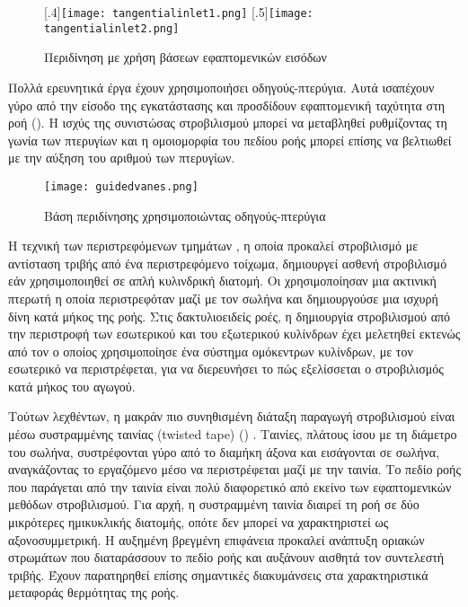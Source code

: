 \begin{figure}[htbp]
\centering
{}	
  [.4\linewidth]{\texttt{[image: tangentialinlet1.png]}}
  [.5\linewidth]{\texttt{[image: tangentialinlet2.png]}}
\caption{Περιδίνηση με χρήση βάσεων εφαπτομενικών εισόδων}\label{fig:tangin}
\end{figure}

Πολλά ερευνητικά έργα \parencites{1976_Murakami}{1975_Zaherzadeh}{1986_Morsi} έχουν χρησιμοποιήσει οδηγούς-πτερύγια. Αυτά ισαπέχουν γύρο από την είσοδο της εγκατάστασης και προσδίδουν εφαπτομενική ταχύτητα στη ροή (). Η ισχύς της συνιστώσας στροβιλισμού μπορεί να μεταβληθεί ρυθμίζοντας τη γωνία των πτερυγίων και η ομοιομορφία του πεδίου ροής μπορεί επίσης να βελτιωθεί με την αύξηση του αριθμού των πτερυγίων.

\begin{figure}[htbp]
\centering
\texttt{[image: guidedvanes.png]}
\caption{Βάση περιδίνησης χρησιμοποιώντας οδηγούς-πτερύγια \cite{1975_Zaherzadeh}}\label{fig:gvanes}
\end{figure}

Η τεχνική των περιστρεφόμενων τμημάτων \parencites{1976_Murakami}{1954_Talbot}{1976_Crane}, η οποία προκαλεί στροβιλισμό με αντίσταση τριβής από ένα περιστρεφόμενο τοίχωμα, δημιουργεί ασθενή στροβιλισμό εάν χρησιμοποιηθεί σε απλή κυλινδρική διατομή. Οι \citeauthor{1976_Murakami} \cite{1976_Murakami} χρησιμοποίησαν μια ακτινική πτερωτή η οποία περιστρεφόταν μαζί με τον σωλήνα και δημιουργούσε μια ισχυρή δίνη κατά μήκος της ροής. Στις δακτυλιοειδείς ροές, η δημιουργία στροβιλισμού από την περιστροφή των εσωτερικού και του εξωτερικού κυλίνδρων έχει μελετηθεί εκτενώς από τον \citeauthor{1935_Taylor} \cite{1935_Taylor} ο οποίος χρησιμοποίησε ένα σύστημα ομόκεντρων κυλίνδρων, με τον εσωτερικό να περιστρέφεται, για να διερευνήσει το πώς εξελίσσεται ο στροβιλισμός κατά μήκος του αγωγού.

Τούτων λεχθέντων, η μακράν πιο συνηθισμένη διάταξη παραγωγή στροβιλισμού είναι μέσω συστραμμένης ταινίας (twisted tape) () \parencites{1976_Hong}{2021_Wang}{2001_Manglik}. Ταινίες, πλάτους ίσου με τη διάμετρο του σωλήνα, συστρέφονται γύρο από το διαμήκη άξονα και εισάγονται σε σωλήνα, αναγκάζοντας το εργαζόμενο μέσο να περιστρέφεται μαζί με την ταινία. Το πεδίο ροής που παράγεται από την ταινία είναι πολύ διαφορετικό από εκείνο των εφαπτομενικών μεθόδων στροβιλισμού. Για αρχή, η συστραμμένη ταινία διαιρεί τη ροή σε δύο μικρότερες ημικυκλικής διατομής, οπότε δεν μπορεί να χαρακτηριστεί ως αξονοσυμμετρική. Η αυξημένη βρεγμένη επιφάνεια προκαλεί ανάπτυξη οριακών στρωμάτων που διαταράσσουν το πεδίο ροής και αυξάνουν αισθητά τον συντελεστή τριβής. Έχουν παρατηρηθεί επίσης σημαντικές διακυμάνσεις στα χαρακτηριστικά μεταφοράς θερμότητας της ροής.


